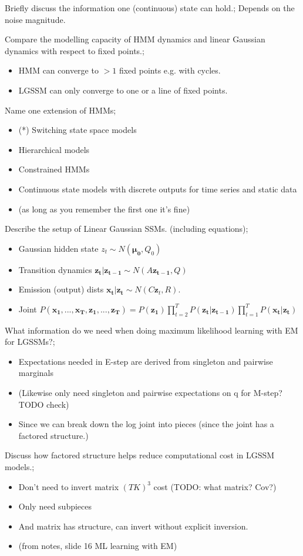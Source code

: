 \documentclass{article}
\begin{document}
Briefly discuss the  information one (continuous) state can hold.; Depends on the noise magnitude. 

Compare the modelling capacity of HMM dynamics and linear Gaussian dynamics with respect to fixed points.; \begin{itemize} \item HMM can converge to $>1$ fixed points e.g. with cycles.  \item LGSSM can only converge to one or a line of fixed points.  \end{itemize}

Name one extension of HMMs; \begin{itemize} \item (*) Switching state space models \item Hierarchical models \item Constrained HMMs \item Continuous state models with discrete outputs for time series and static data \item (as long as you remember the first one it's fine) \end{itemize}

Describe the setup of Linear Gaussian SSMs. (including equations); \begin{itemize} \item Gaussian hidden state $z_t \sim N(\mathbf{\mu_0}, Q_0)$ \item Transition dynamics $\mathbf{z_t|z_{t-1}}\sim  N(A\mathbf{z_{t-1}}, Q)$ \item Emission (output) dists $\mathbf{x_t|z_t}\sim N(C\mathbf{z}_t, R)$.  \item Joint $P(\mathbf{x_1,...,x_T,z_1,...,z_T})=P(\mathbf{z_1})\prod_{t=2}^T P(\mathbf{z_t|z_{t-1}})\prod_{t=1}^T P(\mathbf{x_t|z_t})$ \end{itemize}

What information do we need when doing maximum likelihood learning with EM for LGSSMs?; \begin{itemize} \item Expectations needed in E-step are derived from singleton and pairwise marginals \item (Likewise only need singleton and pairwise expectations on q for M-step? TODO check) \item Since we can break down the log joint into pieces (since the joint has a factored structure.) \end{itemize}

Discuss how factored structure helps reduce computational cost in LGSSM models.; \begin{itemize} \item Don't need to invert matrix $(TK)^3$ cost (TODO: what matrix? Cov?) \item Only need subpieces \item And matrix has structure, can invert without explicit inversion. \item (from notes, slide 16 ML learning with EM) \end{itemize}
\end{document}
